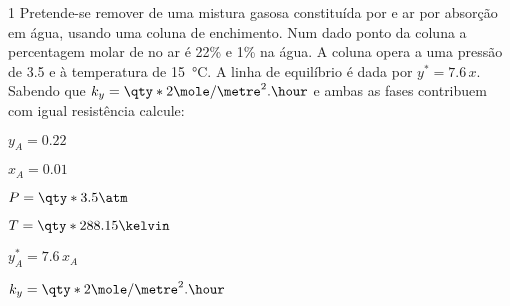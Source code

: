 \documentclass[\mainfilename]{subfiles}
\begin{document}
\begin{questionBox}1{ %
    Pretende-se remover  de uma mistura gasosa constituída por  e ar por absorção em água, usando uma coluna de enchimento. Num dado ponto da coluna a percentagem molar de  no ar é 22\% e 1\% na água. A coluna opera a uma pressão de \qty*{3.5}{\atm} e à temperatura de \qty*{15}{\celsius}. A linha de equilíbrio é dada por \(y^*= 7.6\,x\). Sabendo que \(k_y = \qty*{2}{\mole/\metre^2.\hour}\) e ambas as fases contribuem com igual resistência calcule:
} %
    \begin{itemize}
        \begin{multicols}{2}
            \item \(y_A=0.22\)
            \item \(x_A=0.01\)
            \item \(P=\qty*{3.5}{\atm}\)
            \item \(T=\qty*{288.15}{\kelvin}\)
            \item \(y^*_A=7.6\,x_A\)
            \item \(k_y=\qty*{2}{\mole/\metre^2.\hour}\)
        \end{multicols}
    \end{itemize}
\end{questionBox}
\end{document}
